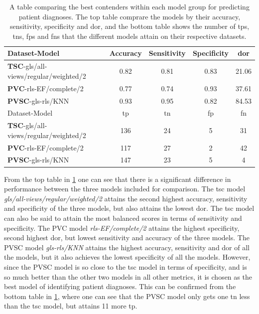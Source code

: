 \begin{table}
    \centering
    \begin{tabular}{lcccc}
        \toprule
        Dataset-Model                                 &  Accuracy &  Sensitivity &  Specificity &  \acrshort{dor} \\
        \midrule
        \textbf{TSC}-gls/all-views/regular/weighted/2 &      0.82 &         0.81 &         0.83 & 21.06 \\
        \textbf{PVC}-rls-EF/complete/2                &      0.77 &         0.74 &         0.93 & 37.61 \\
        \textbf{PVSC}-gls-rls/KNN                     &      0.93 &         0.95 &         0.82 & 84.53 \\
        \midrule
        Dataset-Model                                 &  \acrshort{tp} &  \acrshort{tn} &  \acrshort{fp} &  \acrshort{fn} \\
        \midrule
        \textbf{TSC}-gls/all-views/regular/weighted/2 & 136 &  24 &   5 &  31 \\
        \textbf{PVC}-rls-EF/complete/2                & 117 &  27 &   2 &  42 \\
        \textbf{PVSC}-gls-rls/KNN                     & 147 &  23 &  5  &   4 \\
        \bottomrule
    \end{tabular}
    \caption{A table comparing the best contenders within each model group for predicting patient diagnoses. 
             The top table comprare the models by their accuracy, sensitivity, specificity and \acrshort{dor}, 
             and the bottom table shows the number of \acrshort{tp}s, \acrshort{tn}s, \acrshort{fp}s and \acrshort{fn}s that the different models attain on their respective datasets.}
    \label{tab:pd_compare}
\end{table}

From the top table in \ref{tab:pd_compare} one can see that there is a significant difference in performance between the three models included for comparison.
The \acrshort{tsc} model \textit{gls/all-views/regular/weighted/2} attains the second highest accuracy, sensitivity and specificity of the three models, but also attains the lowest \acrshort{dor}.
The \acrshort{tsc} model can also be said to attain the most balanced scores in terms of sensitivity and specificity. 
The PVC model \textit{rls-EF/complete/2} attains the highest specificity, second highest \acrshort{dor}, but lowest sensitivity and accuracy of the three models. 
The PVSC model \textit{gls-rls/KNN} attains the highest accuracy, sensitivity and \acrshort{dor} of all the models, but it also achieves the lowest specificity of all the models. 
However, since the PVSC model is so close to the \acrshort{tsc} model in terms of specificity, and is so much better than the other two models in all other metrics, it is chosen as the best model of 
identifying patient diagnoses.
This can be confirmed from the bottom table in \ref{tab:pd_compare}, where one can see that the PVSC model only gets one \acrshort{tn} less than the \acrshort{tsc} model, but attains 11 more \acrshort{tp}.

